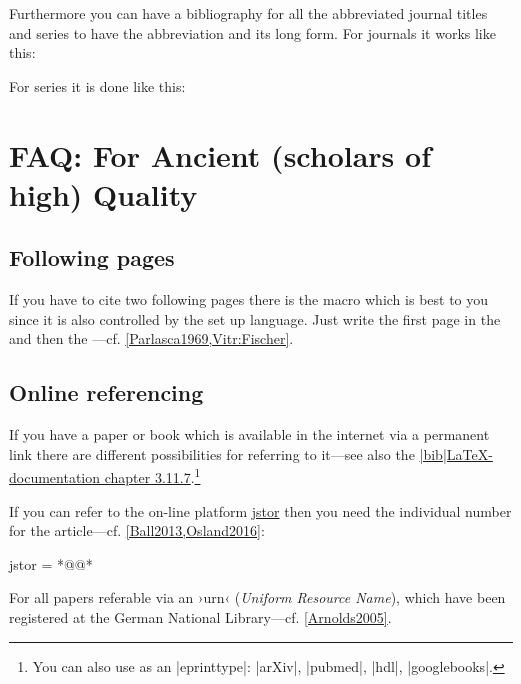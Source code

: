 \documentclass[a4paper,
10pt,
greek,
french,
spanish,
italian,
ngerman,
english,
]{ltxdoc}
\begin{document}
\begin{refsection}
Furthermore you can have a bibliography for all the abbreviated journal titles and series to have the abbreviation and its long form.
For journals it works like this:
\begin{example}
\end{example}

For series it is done like this:
\begin{example}
\end{example}
\end{refsection}


\section{FAQ: For  Ancient (scholars of high) Quality}
\subsection{Following pages}
\DescribeMacro{\psq} If you have to cite two following pages there is the macro  which is best to you since it is also controlled by the set up language.
Just write the first page in the  and then the ---cf. \cref{Parlasca1969,Vitr:Fischer}.

\subsection{Online referencing}
 If you have a paper or book which is available 
in the internet via a permanent link there are different possibilities for referring to it---see also the
 \href{http://tug.ctan.org/macros/latex/exptl/biblatex/doc/biblatex.pdf}{|bib|\LaTeX-documentation chapter 3.11.7}.\footnote{You can also use as an |eprinttype|: |arXiv|, |pubmed|, |hdl|, |googlebooks|.
}

 If you can refer to the on-line platform \href{www.jstor.org}{jstor} then you need the individual number for the article---cf. \cref{Ball2013,Osland2016}:

\begin{code}
jstor = *@@*
\end{code}  

For all papers referable via an ›urn‹ (\emph{Uniform Resource Name}), which have been registered at the German National Library---cf. \cref{Arnolds2005}.
\end{document}
